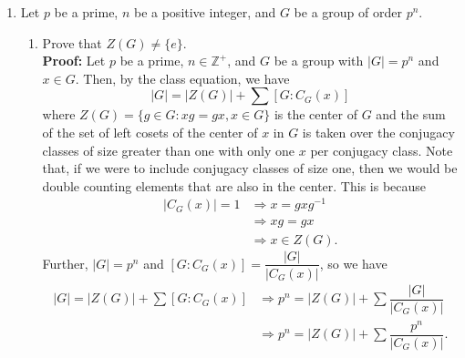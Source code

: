 \documentclass{article}
\begin{document}
\begin{enumerate}
\begin{enumerate}
        \begin{align*}
            ab^{-1} = c &\Longrightarrow  h_1k_1(h_2k_2)^{-1} = h_3k_3 \\
            &\Longrightarrow  h_1k_1k_2^{-1}h_2^{-1} = h_3k_3 \\
            &\Longrightarrow h_1k_4h_2^{-1} = h_3k_3 \text{ since } K \leq G \\
            &\Longrightarrow h_3^{-1}h_1k_4h_2^{-1} = k_3 \\
            &\Longrightarrow h_4k_4h_2^{-1} = k_3 \text{ since } H \leq G \\
            &\Longrightarrow h_4k_4 = k_3h_2 \\
            &\Longrightarrow HK = KH \\
            &\Longrightarrow HK \leq G. \ \square 
        \end{align*}
    \end{enumerate}
    \item Let $p$ be a prime, $n$ be a positive integer, and $G$ be a group of order $p^n$.
    \begin{enumerate}
        \item Prove that $Z(G) \neq \{e\}$. \\
        \textbf{Proof:} Let $p$ be a prime, $n \in \mathbb{Z}^+$, and $G$ be a group with $|G| = p^n$ and $x \in G$. Then, by the class 
        equation, we have
        \[
            |G| = |Z(G)| + \sum{[G:C_G(x)]}
        \]
        where $Z(G) = \{g \in G: xg=gx, x \in G\}$ is the center of $G$ and the sum of the set of left cosets of the center of $x$ in $G$ 
        is taken over the conjugacy classes of size greater than one with only one $x$ per conjugacy class. Note that, if we were to include 
        conjugacy classes of size one, then we would be double counting elements that are also in the center. This is because 
        \begin{align*}
            |C_G(x)| = 1 &\Longrightarrow x = gxg^{-1} \\
            &\Longrightarrow xg = gx \\
            &\Longrightarrow x \in Z(G).
        \end{align*}
        Further, $|G|= p^n$ and $[G:C_G(x)] = \dfrac{|G|}{|C_G(x)|}$, so we have
        \begin{align*}
            |G| = |Z(G)| + \sum{[G:C_G(x)]} &\Longrightarrow p^n = |Z(G)| + \sum{\dfrac{|G|}{|C_G(x)|}} \\
            &\Longrightarrow p^n = |Z(G)| + \sum{\dfrac{p^n}{|C_G(x)|}}.

\end{align*}
\end{enumerate}
\end{enumerate}
\end{document}
